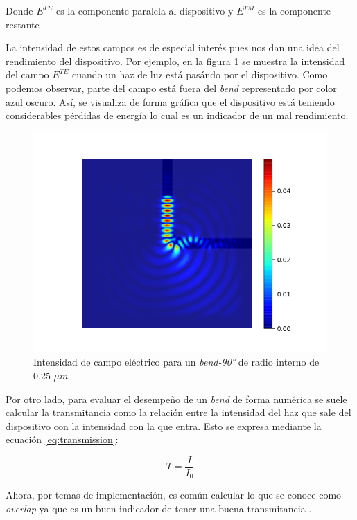 Donde $E^{TE}$ es la componente paralela al dispositivo y $E^{TM}$ es la componente restante \citep{Hohenester2020}. 

La intensidad de estos campos es de especial interés pues nos dan una idea del rendimiento del dispositivo. 
Por ejemplo, en la figura \ref{fig:efield} se muestra la intensidad del campo $E^{TE}$ cuando un haz de luz está pasándo por el dispositivo. 
Como podemos observar, parte del campo está fuera del \emph{bend} representado por color azul oscuro.
Así, se visualiza de forma gráfica que el dispositivo está teniendo considerables pérdidas de energía lo cual es un indicador de un mal rendimiento.


\begin{figure}[ht]
  \centering
  \includegraphics[scale=0.8]{image/theory/bend-field.png}
  \caption{Intensidad de campo eléctrico para un \emph{bend-90°} de radio interno de 0.25 $\mu m$}
  \label{fig:efield}
\end{figure}

Por otro lado, para evaluar el desempeño de un \emph{bend} de forma numérica se suele calcular la transmitancia como la relación entre la intensidad del haz que sale del dispositivo con la intensidad con la que entra. Esto se expresa mediante la ecuación \ref{eq:transmission}:

\begin{equation}
  T = \frac{I}{I_0}
\label{eq:transmission}
\end{equation}

Ahora, por temas de implementación, es común calcular lo que se conoce como \emph{overlap} ya que es un buen indicador de tener una buena transmitancia \citep{Su2020}.


